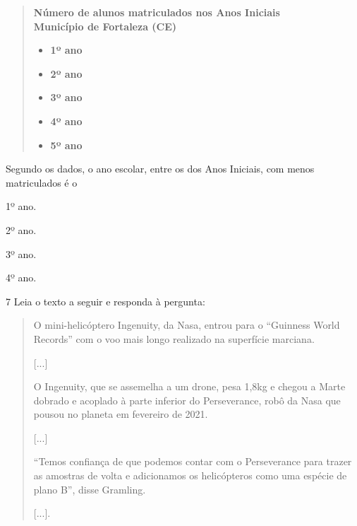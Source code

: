 \begin{quote}
\textbf{Número de alunos matriculados nos Anos Iniciais}\\
\textbf{Município de Fortaleza (CE)}

\begin{itemize}
\item \textbf{1º ano}

\item \textbf{2º ano}

\item \textbf{3º ano}

\item \textbf{4º ano}

\item \textbf{5º ano}
\end{itemize}
\end{quote}

Segundo os dados, o ano escolar, entre os dos Anos Iniciais, com menos matriculados é o

\begin{escolha}
\item 1º ano.

\item 2º ano.

\item 3º ano.

\item 4º ano.
\end{escolha}


\num{7} Leia o texto a seguir e responda à pergunta:

\begin{quote}
O mini-helicóptero Ingenuity, da Nasa, entrou para o “Guinness World
Records” com o voo mais longo realizado na superfície marciana.

{[}...{]}

O Ingenuity, que se assemelha a um drone, pesa 1,8kg e chegou a Marte
dobrado e acoplado à parte inferior do Perseverance, robô da Nasa que
pousou no planeta em fevereiro de 2021.

{[}...{]}

“Temos confiança de que podemos contar com o Perseverance para trazer
as amostras de volta e adicionamos os helicópteros como uma espécie de
plano B”, disse Gramling.

{[}...{]}.
\end{quote}

